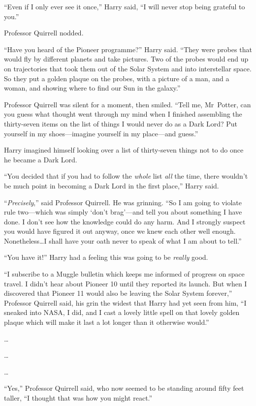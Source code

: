 “Even if I only ever see it once,” Harry said, “I will never stop being grateful to you.”

Professor Quirrell nodded.

“Have you heard of the Pioneer programme?” Harry said. “They were probes that would fly by different planets and take pictures. Two of the probes would end up on trajectories that took them out of the Solar System and into interstellar space. So they put a golden plaque on the probes, with a picture of a man, and a woman, and showing where to find our Sun in the galaxy.”

Professor Quirrell was silent for a moment, then smiled. “Tell me, Mr~Potter, can you guess what thought went through my mind when I finished assembling the thirty-seven items on the list of things I would never do as a Dark Lord? Put yourself in my shoes—imagine yourself in my place—and guess.”

Harry imagined himself looking over a list of thirty-seven things not to do once he became a Dark Lord.

“You decided that if you had to follow the \emph{whole} list \emph{all} the time, there wouldn’t be much point in becoming a Dark Lord in the first place,” Harry said.

“\emph{Precisely},” said Professor Quirrell. He was grinning. “So I am going to violate rule two—which was simply ‘don’t brag’—and tell you about something I have done. I don’t see how the knowledge could do any harm. And I strongly suspect you would have figured it out anyway, once we knew each other well enough. Nonetheless…I shall have your oath never to speak of what I am about to tell.”

“You have it!” Harry had a feeling this was going to be \emph{really} good.

“I subscribe to a Muggle bulletin which keeps me informed of progress on space travel. I didn’t hear about Pioneer 10 until they reported its launch. But when I discovered that Pioneer 11 would also be leaving the Solar System forever,” Professor Quirrell said, his grin the widest that Harry had yet seen from him, “I sneaked into NASA, I did, and I cast a lovely little spell on that lovely golden plaque which will make it last a lot longer than it otherwise would.”

…

…

…

“Yes,” Professor Quirrell said, who now seemed to be standing around fifty feet taller, “I thought that was how you might react.”

